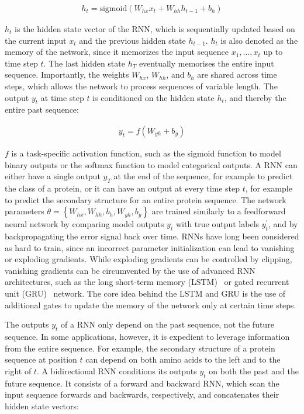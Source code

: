 \begin{align}
  h_t=\textrm{sigmoid}(W_{hx}x_t+W_{hh}h_{t-1}+b_h)
\end{align}

$h_t$ is the hidden state vector of the RNN, which is sequentially updated based on the current input $x_t$ and the previous hidden state $h_{t-1}$. $h_t$ is also denoted as the memory of the network, since it memorizes the input sequence $x_1,\ldots,x_t$ up to time step $t$. The last hidden state $h_T$ eventually memorises the entire input sequence. Importantly, the weights $W_{hx}$, $W_{hh}$, and $b_h$ are shared across time steps, which allows the network to process sequences of variable length. The output $y_t$ at time step $t$ is conditioned on the hidden state $h_t$, and thereby the entire past sequence:

\begin{align}
  y_t=f(W_{yh}+b_y)
\end{align}


$f$ is a task-specific activation function, such as the sigmoid function to model binary outputs or the softmax function to model categorical outputs. A RNN can either have a single output $y_T$ at the end of the sequence, for example to predict the class of a protein, or it can have an output at every time step $t$, for example to predict the secondary structure for an entire protein sequence. The network parameters $\theta=\left\{W_{hx},W_{hh},b_h,W_{yh},b_y\right\}$ are trained similarly to a feedforward neural network by comparing model outputs $y_t$ with true output labels $y^\prime_t$, and by backpropagating the error signal back over time. RNNs have long been considered as hard to train, since an incorrect parameter initialization can lead to vanishing or exploding gradients. While exploding gradients can be controlled by clipping, vanishing gradients can be circumvented by the use of advanced RNN architectures, such as the long short-term memory (LSTM)~\citep{hochreiter_long_1997} or gated recurrent unit (GRU)~\citep{chung_empirical_2014} network. The core idea behind the LSTM and GRU is the use of additional gates to update the memory of the network only at certain time steps.

The outputs $y_t$ of a RNN only depend on the past sequence, not the future sequence. In some applications, however, it is expedient to leverage information from the entire sequence. For example, the secondary structure of a protein sequence at position $t$ can depend on both amino acids to the left and to the right of $t$. A bidirectional RNN conditions its outputs $y_t$ on both the past and the future sequence. It consists of a forward and backward RNN, which scan the input sequence forwards and backwards, respectively, and concatenates their hidden state vectors:


